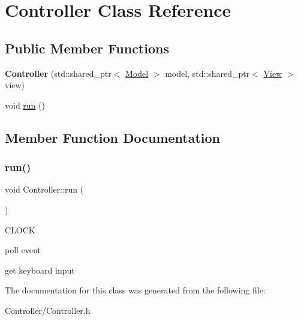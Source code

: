 \hypertarget{class_controller}{}\section{Controller Class Reference}
\label{class_controller}
\subsection*{Public Member Functions}
\begin{DoxyCompactItemize}
\item 
\mbox{\label{class_controller_afca093b5b1958be0bb60d3b9772f340f}} 
{\bfseries Controller} (std\+::shared\+\_\+ptr$<$ \hyperlink{class_model}{Model} $>$ model, std\+::shared\+\_\+ptr$<$ \hyperlink{class_view}{View} $>$ view)
\item 
void \hyperlink{class_controller_a692f0f5dc600cdcb79786a31cf283ce1}{run} ()
\end{DoxyCompactItemize}


\subsection{Member Function Documentation}
\mbox{\label{class_controller_a692f0f5dc600cdcb79786a31cf283ce1}} 
\subsubsection{\texorpdfstring{run()}{run()}}
{\footnotesize\ttfamily void Controller\+::run (\begin{DoxyParamCaption}{ }\end{DoxyParamCaption})\hspace{0.3cm}{\ttfamily [inline]}}

C\+L\+O\+CK

poll event

get keyboard input 

The documentation for this class was generated from the following file\+:\begin{DoxyCompactItemize}
\item 
Controller/Controller.\+h\end{DoxyCompactItemize}
